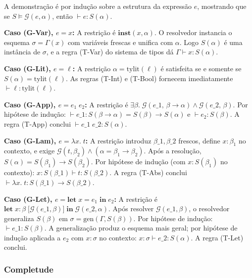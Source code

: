   A demonstração é por indução sobre a estrutura da expressão \(e\),
  mostrando que se \(S \models \mathcal{G}(e, \alpha)\), então \(\vdash
  e : S(\alpha)\).

  \textbf{Caso (G-Var), \(e = x\):} A restrição é \(\mathbf{inst}(x,
  \alpha)\). O resolvedor instancia o esquema \(\sigma = \Gamma(x)\)
  com variáveis frescas e unifica com \(\alpha\). Logo \(S(\alpha)\) é
  uma instância de \(\sigma\), e a regra (T-Var) do sistema de tipos dá
  \(\Gamma \vdash x : S(\alpha)\).

  \textbf{Caso (G-Lit), \(e = \ell\):} A restrição
  \(\alpha = \mathrm{tylit}(\ell)\) é
  satisfeita se e somente se \(S(\alpha) =
  \mathrm{tylit}(\ell)\). As regras (T-Int) e (T-Bool)
  fornecem imediatamente \(\vdash \ell : \mathrm{tylit}(\ell)\).

  \textbf{Caso (G-App), \(e = e_1\; e_2\):} A restrição é
  \(\exists \beta.\;
    \mathcal{G}(e\_1,\, \beta \to \alpha) \wedge
  \mathcal{G}(e\_2,\, \beta)\). Por hipótese
  de indução: \(\vdash e\_1 : S(\beta \to \alpha) =
  S(\beta) \to S(\alpha)\) e \(\vdash e_2 : S(\beta)\). A
  regra (T-App) conclui \(\vdash e\_1\; e\_2
  : S(\alpha)\).

  \textbf{Caso (G-Lam), \(e = \lambda x.\; t\):} A restrição introduz
  \(\beta\_1, \beta\_2\) frescos, define \(x
  : \beta_1\) no contexto, e exige \(\mathcal{G}(t, \beta_2) \wedge
  (\alpha = \beta_1 \to \beta_2)\). Após a resolução, \(S(\alpha) =
  S(\beta_1) \to S(\beta_2)\). Por hipótese de indução (com \(x :
  S(\beta_1)\) no contexto): \(x : S(\beta\_1) \vdash t :
  S(\beta\_2)\). A regra (T-Abs) conclui
  \(\vdash \lambda x.\; t : S(\beta\_1) \to
  S(\beta\_2)\).

  \textbf{Caso (G-Let), \(e = \mathbf{let}\; x = e_1\; \mathbf{in}\;
  e_2\):} A restrição é \(\mathbf{let}\; x :
    \beta\; {[}\mathcal{G}(e\_1, \beta){]}\;
  \mathbf{in}\; \mathcal{G}(e\_2, \alpha)\).
  Após resolver \(\mathcal{G}(e\_1, \beta)\),
  o resolvedor generaliza \(S(\beta)\) em \(\sigma =
  \mathrm{gen}(\Gamma, S(\beta))\). Por hipótese de
  indução: \(\vdash e\_1 : S(\beta)\). A
  generalização produz o esquema mais geral; por hipótese de indução
  aplicada a \(e_2\) com \(x : \sigma\) no contexto: \(x :
  \sigma \vdash e\_2 : S(\alpha)\). A regra (T-Let) conclui.

  \subsubsection{Completude}

